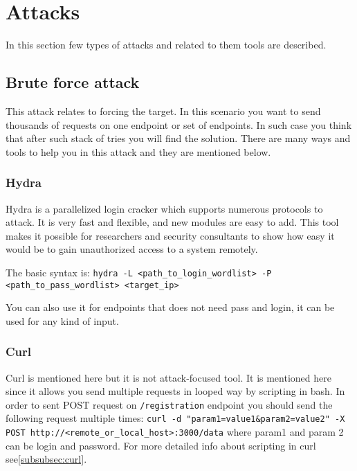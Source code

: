 
\section{Attacks}

In this section few types of attacks and related to them tools are described.

\subsection{Brute force attack}
\label{subsec:bruteforce}
This attack relates to forcing the target.
In this scenario you want to send thousands of requests on one endpoint or set of endpoints.
In such case you think that after such stack of tries you will find the solution.
There are many ways and tools to help you in this attack and they are mentioned below.

\subsubsection{Hydra}
\label{subsubsec:hydra}
Hydra is a parallelized login cracker which supports numerous protocols to attack.
It is very fast and flexible, and new modules are easy to add.
This tool makes it possible for researchers and security consultants to show how easy it would be to gain unauthorized access to a system remotely.

The basic syntax is: \texttt{hydra -L <path\_to\_login\_wordlist> -P <path\_to\_pass\_wordlist> <target\_ip> }

You can also use it for endpoints that does not need pass and login, it can be used for any kind of input.

\subsubsection{Curl}
Curl is mentioned here but it is not attack-focused tool.
It is mentioned here since it allows you send multiple requests in looped way by scripting in bash.
In order to sent POST request on \texttt{/registration} endpoint you should send the following request multiple times:\newline \newline
\texttt{curl -d "param1=value1\&param2=value2" -X POST http://<remote\_or\_local\_host>:3000/data} \newline
where param1 and param 2 can be login and password.
For more detailed info about scripting in curl see\ref{subsubsec:curl}.